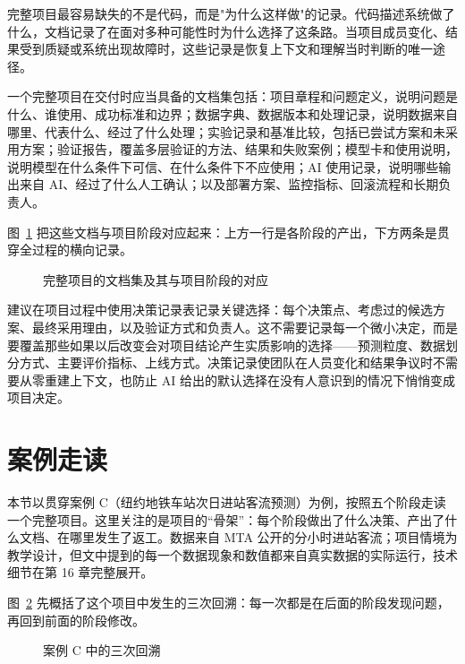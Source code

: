 完整项目最容易缺失的不是代码，而是"为什么这样做"的记录。代码描述系统做了什么，文档记录了在面对多种可能性时为什么选择了这条路。当项目成员变化、结果受到质疑或系统出现故障时，这些记录是恢复上下文和理解当时判断的唯一途径。

一个完整项目在交付时应当具备的文档集包括：项目章程和问题定义，说明问题是什么、谁使用、成功标准和边界；数据字典、数据版本和处理记录，说明数据来自哪里、代表什么、经过了什么处理；实验记录和基准比较，包括已尝试方案和未采用方案；验证报告，覆盖多层验证的方法、结果和失败案例；模型卡和使用说明，说明模型在什么条件下可信、在什么条件下不应使用；AI 使用记录，说明哪些输出来自 AI、经过了什么人工确认；以及部署方案、监控指标、回滚流程和长期负责人。

图~\ref{fig:ch15_docs} 把这些文档与项目阶段对应起来：上方一行是各阶段的产出，下方两条是贯穿全过程的横向记录。

\begin{figure}[H]
  \centering
  \caption{完整项目的文档集及其与项目阶段的对应}
  \label{fig:ch15_docs}
\end{figure}

建议在项目过程中使用决策记录表记录关键选择：每个决策点、考虑过的候选方案、最终采用理由，以及验证方式和负责人。这不需要记录每一个微小决定，而是要覆盖那些如果以后改变会对项目结论产生实质影响的选择——预测粒度、数据划分方式、主要评价指标、上线方式。决策记录使团队在人员变化和结果争议时不需要从零重建上下文，也防止 AI 给出的默认选择在没有人意识到的情况下悄悄变成项目决定。

\section{案例走读}

本节以贯穿案例 C（纽约地铁车站次日进站客流预测）为例，按照五个阶段走读一个完整项目。这里关注的是项目的“骨架”：每个阶段做出了什么决策、产出了什么文档、在哪里发生了返工。数据来自 MTA 公开的分小时进站客流\cite{mta2025hourly}；项目情境为教学设计，但文中提到的每一个数据现象和数值都来自真实数据的实际运行，技术细节在第 16 章完整展开。

图~\ref{fig:ch15_case} 先概括了这个项目中发生的三次回溯：每一次都是在后面的阶段发现问题，再回到前面的阶段修改。

\begin{figure}[H]
  \centering
  \caption{案例 C 中的三次回溯}
  \label{fig:ch15_case}
\end{figure}

